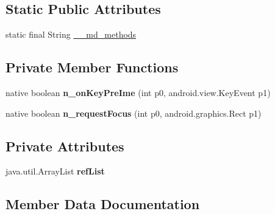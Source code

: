 \subsection*{Static Public Attributes}
\begin{DoxyCompactItemize}
\item 
static final String \hyperlink{classmd5b60ffeb829f638581ab2bb9b1a7f4f3f_1_1FormsEditText_a2cbb395bc194ab641c62a79e13d6705f}{\+\_\+\+\_\+md\+\_\+methods}
\end{DoxyCompactItemize}
\subsection*{Private Member Functions}
\begin{DoxyCompactItemize}
\item 
\mbox{\label{classmd5b60ffeb829f638581ab2bb9b1a7f4f3f_1_1FormsEditText_add66e61307ce4c0dcfdbca64e20e3adc}} 
native boolean {\bfseries n\+\_\+on\+Key\+Pre\+Ime} (int p0, android.\+view.\+Key\+Event p1)
\item 
\mbox{\label{classmd5b60ffeb829f638581ab2bb9b1a7f4f3f_1_1FormsEditText_a13033b8663d0fb0483a889604843bed6}} 
native boolean {\bfseries n\+\_\+request\+Focus} (int p0, android.\+graphics.\+Rect p1)
\end{DoxyCompactItemize}
\subsection*{Private Attributes}
\begin{DoxyCompactItemize}
\item 
\mbox{\label{classmd5b60ffeb829f638581ab2bb9b1a7f4f3f_1_1FormsEditText_ae4cf7e6b7330b3bf927c0a23059cf810}} 
java.\+util.\+Array\+List {\bfseries ref\+List}
\end{DoxyCompactItemize}


\subsection{Member Data Documentation}
\mbox{\label{classmd5b60ffeb829f638581ab2bb9b1a7f4f3f_1_1FormsEditText_a2cbb395bc194ab641c62a79e13d6705f}} 
